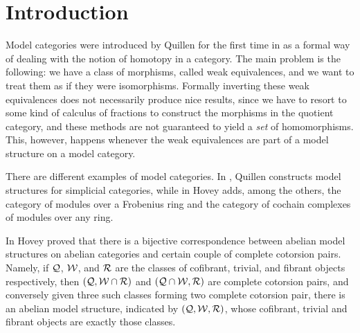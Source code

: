\chapter{Introduction}\label{ch:introduction}

Model categories were introduced by Quillen for the first time in \cite{Q} as a formal way of dealing with the notion of homotopy in a category. The main problem is the following: we have a class of morphisms, called weak equivalences, and we want to treat them as if they were isomorphisms. Formally inverting these weak equivalences does not necessarily produce nice results, since we have to resort to some kind of calculus of fractions to construct the morphisms in the quotient category, and these methods are not guaranteed to yield a \emph{set} of homomorphisms. This, however, happens whenever the weak equivalences are part of a model structure on a model category.

There are different examples of model categories. In \cite{Q}, Quillen constructs model structures for simplicial categories, while in \cite{Hov99} Hovey adds, among the others, the category of modules over a Frobenius ring and the category of cochain complexes of modules over any ring.

In \cite{Hov02} Hovey proved that there is a bijective correspondence between abelian model structures on abelian categories and certain couple of complete cotorsion pairs. Namely, if $\mathcal{Q}$, $\mathcal{W}$, and $\mathcal{R}$ are the classes of cofibrant, trivial, and fibrant objects respectively, then $(\mathcal{Q},\mathcal{W}\cap\mathcal{R})$ and $(\mathcal{Q}\cap\mathcal{W},\mathcal{R})$ are complete cotorsion pairs, and conversely given three such classes forming two complete cotorsion pair, there is an abelian model structure, indicated by $(\mathcal{Q},\mathcal{W},\mathcal{R})$, whose cofibrant, trivial and fibrant objects are exactly those classes.

